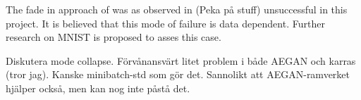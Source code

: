 The fade in approach of \textcite{karras2017progressive} was as observed in (Peka på stuff) unsuccessful in this project. It is believed that this mode of failure is data dependent. Further research on MNIST is proposed to asses this case.

Diskutera mode collapse. Förvånansvärt litet problem i både AEGAN och karras (tror jag). Kanske minibatch-std som gör det. Sannolikt att AEGAN-ramverket hjälper också, men kan nog inte påstå det.


